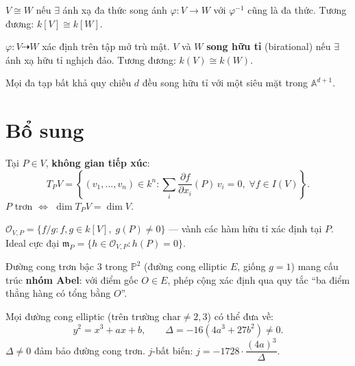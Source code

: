 \documentclass[12pt,a4paper]{article}
\begin{document}
\begin{dinhnghia}[title={Đẳng cấu}]
  $V \cong W$ nếu $\exists$ ánh xạ đa thức song ánh $\varphi: V \to W$ với $\varphi^{-1}$ cũng là đa thức. Tương đương: $k[V] \cong k[W]$.
\end{dinhnghia}

\begin{dinhnghia}[title={Ánh xạ hữu tỉ (rational map)}]
  $\varphi: V \dashrightarrow W$ xác định trên tập mở trù mật. $V$ và $W$ \textbf{song hữu tỉ} (birational) nếu $\exists$ ánh xạ hữu tỉ nghịch đảo. Tương đương: $k(V) \cong k(W)$.
\end{dinhnghia}

\begin{dinhly}
  Mọi đa tạp bất khả quy chiều $d$ đều song hữu tỉ với một siêu mặt trong $\mathbb{A}^{d+1}$.
\end{dinhly}

\section{Bổ sung}

\begin{dinhnghia}[title={Không gian tiếp xúc Zariski}]
  Tại $P \in V$, \textbf{không gian tiếp xúc}:
  \[
    T_P V = \left\{(v_1, \ldots, v_n) \in k^n : \sum_i \frac{\partial f}{\partial x_i}(P)\,v_i = 0,\;\forall f \in I(V)\right\}.
  \]
  $P$ trơn $\Leftrightarrow$ $\dim T_P V = \dim V$.
\end{dinhnghia}

\begin{dinhnghia}[title={Vành địa phương}]
  $\mathcal{O}_{V,P} = \{f/g : f, g \in k[V],\; g(P) \ne 0\}$ --- vành các hàm hữu tỉ xác định tại $P$. Ideal cực đại $\mathfrak{m}_P = \{h \in \mathcal{O}_{V,P} : h(P) = 0\}$.
\end{dinhnghia}

\begin{dinhly}[title={Đường cong elliptic --- Cấu trúc nhóm}]
  Đường cong trơn bậc 3 trong $\mathbb{P}^2$ (đường cong elliptic $E$, giống $g = 1$) mang cấu trúc \textbf{nhóm Abel}: với điểm gốc $O \in E$, phép cộng xác định qua quy tắc ``ba điểm thẳng hàng có tổng bằng $O$''.
\end{dinhly}

\begin{congthuc}[title={Dạng Weierstrass}]
  Mọi đường cong elliptic (trên trường $\text{char} \ne 2, 3$) có thể đưa về:
  \[
    y^2 = x^3 + ax + b, \qquad \Delta = -16(4a^3 + 27b^2) \ne 0.
  \]
  $\Delta \ne 0$ đảm bảo đường cong trơn. $j$-bất biến: $j = -1728 \cdot \dfrac{(4a)^3}{\Delta}$.
\end{congthuc}
\end{document}
